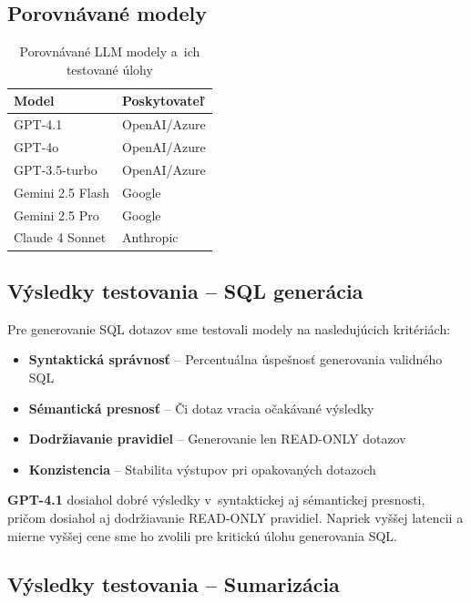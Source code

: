 \documentclass[a4paper, 12pt]{article}
\begin{document}
\subsection{Porovnávané modely}

\begin{table}[H]
\centering
\begin{tabular}{ll}
\toprule
\textbf{Model} & \textbf{Poskytovateľ}  \\
\midrule
GPT-4.1 & OpenAI/Azure  \\
GPT-4o & OpenAI/Azure  \\
GPT-3.5-turbo & OpenAI/Azure  \\
Gemini 2.5 Flash & Google  \\
Gemini 2.5 Pro & Google  \\
Claude 4 Sonnet & Anthropic  \\
\bottomrule
\end{tabular}
\caption{Porovnávané LLM modely a~ich testované úlohy}
\end{table}

\subsection{Výsledky testovania -- SQL generácia}

Pre generovanie SQL dotazov sme testovali modely na nasledujúcich kritériách:

\begin{itemize}
    \item \textbf{Syntaktická správnosť} -- Percentuálna úspešnosť generovania validného SQL
    \item \textbf{Sémantická presnosť} -- Či dotaz vracia očakávané výsledky
    \item \textbf{Dodržiavanie pravidiel} -- Generovanie len READ-ONLY dotazov
    \item \textbf{Konzistencia} -- Stabilita výstupov pri opakovaných dotazoch
\end{itemize}

\textbf{GPT-4.1} dosiahol dobré výsledky v~syntaktickej aj sémantickej presnosti, pričom dosiahol aj dodržiavanie READ-ONLY pravidiel. Napriek vyššej latencii a mierne vyššej cene sme ho zvolili pre kritickú úlohu generovania SQL.

\subsection{Výsledky testovania -- Sumarizácia}
\end{document}
